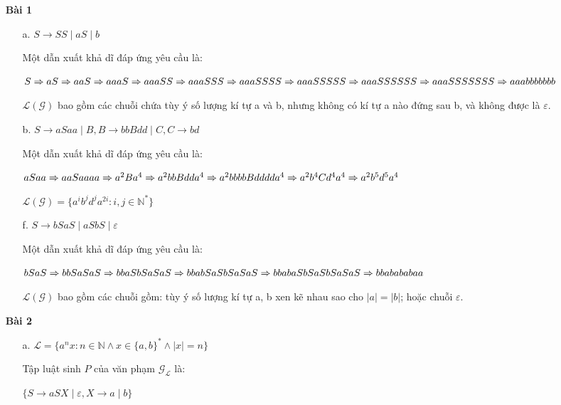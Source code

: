 \documentclass[12pt, a4paper]{article}
\newcommand{\GDerivative}[2] {
	\foreach[count=\i] \j in {#1} {
		\j
		\ifthenelse{\i < #2}{ \Rightarrow }{}
	}
}
\begin{document}
	\begin{itemize}
		
		\item[ \textbf{Bài 1}]
		
		\begin{itemize}
		
			\item[a.] $S \rightarrow SS \mid aS \mid b$
			
			Một dẫn xuất khả dĩ đáp ứng yêu cầu là:
			
			$ \GDerivative{S, aS, aaS, aaaS, aaaSS, aaaSSS, aaaSSSS, aaaSSSSS, aaaSSSSSS, aaaSSSSSSS, aaabbbbbbb}{11} $			
			
			$\mathcal{L}(\mathcal{G})$ bao gồm các chuỗi chứa tùy ý số lượng kí tự a và b, nhưng không có kí tự a nào đứng sau b, và không được là $\varepsilon$.
			
			\item[b.] $S \rightarrow aSaa \mid B, B \rightarrow bbBdd \mid C, C \rightarrow bd$
			
			Một dẫn xuất khả dĩ đáp ứng yêu cầu là:
			
			$\GDerivative{aSaa, aaSaaaa, a^2Ba^4, a^2bbBdda^4, a^2bbbbBdddda^4, a^2b^4Cd^4a^4, a^2b^5d^5a^4}{7}$
			
			$\mathcal{L}(\mathcal{G}) = \{ a^ib^jd^ja^{2i}: i, j \in \mathbb{N}^* \}$
			
			\item[f.] $S \rightarrow bSaS \mid aSbS \mid \varepsilon$
			
			Một dẫn xuất khả dĩ đáp ứng yêu cầu là:
			
			$\GDerivative{bSaS, bbSaSaS, bbaSbSaSaS, bbabSaSbSaSaS, bbabaSbSaSbSaSaS, bbabababaa}{6}$
			
			$\mathcal{L}(\mathcal{G})$ bao gồm các chuỗi gồm: tùy ý số lượng kí tự a, b xen kẽ nhau sao cho $|a| = |b|$; hoặc chuỗi $\varepsilon$.
			
		\end{itemize}
		
		\item[ \textbf{Bài 2} ]
		
		\begin{itemize}
			
			\item[a.] $\mathcal{L} = \{ a^nx: n \in \mathbb{N} \wedge x \in \{a, b\}^* \wedge |x| = n \}$
			
			Tập luật sinh $P$ của văn phạm $\mathcal{G}_{\mathcal{L}}$ là: 
			
			$\{
			S \rightarrow aSX \mid \varepsilon,
			X \rightarrow a \mid b
			\}$			
			

\end{itemize}
\end{itemize}
\end{document}

